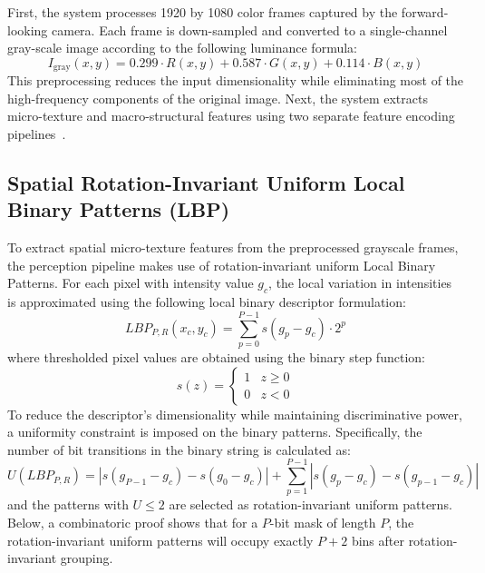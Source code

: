 First, the system processes 1920 by 1080 color frames captured by the forward-looking camera. Each frame is down-sampled and converted to a single-channel gray-scale image according to the following luminance formula:
\begin{equation}
I_{\text{gray}}(x,y) = 0.299 \cdot R(x,y) + 0.587 \cdot G(x,y) + 0.114 \cdot B(x,y)
\end{equation}
This preprocessing reduces the input dimensionality while eliminating most of the high-frequency components of the original image. Next, the system extracts micro-texture and macro-structural features using two separate feature encoding pipelines~\cite{liu2023tire}.

\subsection{Spatial Rotation-Invariant Uniform Local Binary Patterns (LBP)}

To extract spatial micro-texture features from the preprocessed grayscale frames, the perception pipeline makes use of rotation-invariant uniform Local Binary Patterns. For each pixel with intensity value $g_c$, the local variation in intensities is approximated using the following local binary descriptor formulation:
\begin{equation}
LBP_{P,R}(x_c, y_c) = \sum_{p=0}^{P-1} s(g_p - g_c) \cdot 2^p \label{eq:lbp_standard}
\end{equation}
where thresholded pixel values are obtained using the binary step function:
\begin{equation}
s(z) = \begin{cases} 1 & z \ge 0 \\ 0 & z < 0 \end{cases} \label{eq:lbp_step}
\end{equation}
To reduce the descriptor's dimensionality while maintaining discriminative power, a uniformity constraint is imposed on the binary patterns. Specifically, the number of bit transitions in the binary string is calculated as:
\begin{equation}
U(LBP_{P,R}) = |s(g_{P-1} - g_c) - s(g_0 - g_c)| + \sum_{p=1}^{P-1} |s(g_p - g_c) - s(g_{p-1} - g_c)| \label{eq:lbp_uniformity}
\end{equation}
and the patterns with $U \le 2$ are selected as rotation-invariant uniform patterns. Below, a combinatoric proof shows that for a $P$-bit mask of length $P$, the rotation-invariant uniform patterns will occupy exactly $P+2$ bins after rotation-invariant grouping.

